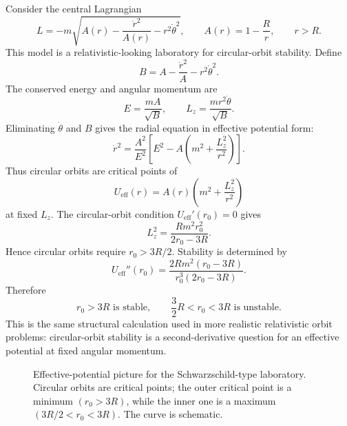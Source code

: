Consider the central Lagrangian
\[
  L=-m\sqrt{
    A(r)-\frac{\dot r^2}{A(r)}-r^2\dot\theta^2
  },
  \qquad
  A(r)=1-\frac{R}{r},
  \qquad r>R.
\]
This model is a relativistic-looking laboratory for circular-orbit stability.
Define
\[
  B=A-\frac{\dot r^2}{A}-r^2\dot\theta^2.
\]
The conserved energy and angular momentum are
\[
  E=\frac{mA}{\sqrt B},
  \qquad
  L_z=\frac{mr^2\dot\theta}{\sqrt B}.
\]
Eliminating \(\dot\theta\) and \(B\) gives the radial equation in effective
potential form:
\[
  \dot r^2
  =
  \frac{A^2}{E^2}
  \left[
    E^2-A\left(m^2+\frac{L_z^2}{r^2}\right)
  \right].
\]
Thus circular orbits are critical points of
\[
  U_{\mathrm{eff}}(r)
  =
  A(r)\left(m^2+\frac{L_z^2}{r^2}\right)
\]
at fixed \(L_z\). The circular-orbit condition \(U_{\mathrm{eff}}'(r_0)=0\)
gives
\[
  L_z^2
  =
  \frac{Rm^2r_0^2}{2r_0-3R}.
\]
Hence circular orbits require \(r_0>3R/2\). Stability is determined by
\[
  U_{\mathrm{eff}}''(r_0)
  =
  \frac{2Rm^2(r_0-3R)}
  {r_0^3(2r_0-3R)}.
\]
Therefore
\[
  \boxed{
  r_0>3R \text{ is stable},\qquad
  \frac32R<r_0<3R \text{ is unstable}.
  }
\]
This is the same structural calculation used in more realistic relativistic
orbit problems: circular-orbit stability is a second-derivative question for
an effective potential at fixed angular momentum.

\begin{figure}[htbp]
\centering
{}
\caption{Effective-potential picture for the Schwarzschild-type laboratory.
Circular orbits are critical points; the outer critical point is a minimum
\((r_0>3R)\), while the inner one is a maximum
\((3R/2<r_0<3R)\). The curve is schematic.}
\label{fig:lab-schwarzschild-effective-potential}
\end{figure}
\FloatBarrier

